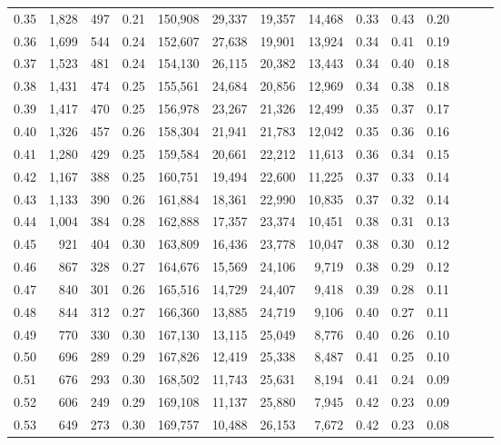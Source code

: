 \begin{tabular}{rrrrrrrrrrrrrr}
0.35 &  1,828 &  497 &  0.21 &  150,908 &   29,337 &  19,357 &  14,468 &  0.33 &  0.43 &      0.20 \\
0.36 &  1,699 &  544 &  0.24 &  152,607 &   27,638 &  19,901 &  13,924 &  0.34 &  0.41 &      0.19 \\
0.37 &  1,523 &  481 &  0.24 &  154,130 &   26,115 &  20,382 &  13,443 &  0.34 &  0.40 &      0.18 \\
0.38 &  1,431 &  474 &  0.25 &  155,561 &   24,684 &  20,856 &  12,969 &  0.34 &  0.38 &      0.18 \\
0.39 &  1,417 &  470 &  0.25 &  156,978 &   23,267 &  21,326 &  12,499 &  0.35 &  0.37 &      0.17 \\
0.40 &  1,326 &  457 &  0.26 &  158,304 &   21,941 &  21,783 &  12,042 &  0.35 &  0.36 &      0.16 \\
0.41 &  1,280 &  429 &  0.25 &  159,584 &   20,661 &  22,212 &  11,613 &  0.36 &  0.34 &      0.15 \\
0.42 &  1,167 &  388 &  0.25 &  160,751 &   19,494 &  22,600 &  11,225 &  0.37 &  0.33 &      0.14 \\
0.43 &  1,133 &  390 &  0.26 &  161,884 &   18,361 &  22,990 &  10,835 &  0.37 &  0.32 &      0.14 \\
0.44 &  1,004 &  384 &  0.28 &  162,888 &   17,357 &  23,374 &  10,451 &  0.38 &  0.31 &      0.13 \\
0.45 &    921 &  404 &  0.30 &  163,809 &   16,436 &  23,778 &  10,047 &  0.38 &  0.30 &      0.12 \\
0.46 &    867 &  328 &  0.27 &  164,676 &   15,569 &  24,106 &   9,719 &  0.38 &  0.29 &      0.12 \\
0.47 &    840 &  301 &  0.26 &  165,516 &   14,729 &  24,407 &   9,418 &  0.39 &  0.28 &      0.11 \\
0.48 &    844 &  312 &  0.27 &  166,360 &   13,885 &  24,719 &   9,106 &  0.40 &  0.27 &      0.11 \\
0.49 &    770 &  330 &  0.30 &  167,130 &   13,115 &  25,049 &   8,776 &  0.40 &  0.26 &      0.10 \\
0.50 &    696 &  289 &  0.29 &  167,826 &   12,419 &  25,338 &   8,487 &  0.41 &  0.25 &      0.10 \\
0.51 &    676 &  293 &  0.30 &  168,502 &   11,743 &  25,631 &   8,194 &  0.41 &  0.24 &      0.09 \\
0.52 &    606 &  249 &  0.29 &  169,108 &   11,137 &  25,880 &   7,945 &  0.42 &  0.23 &      0.09 \\
0.53 &    649 &  273 &  0.30 &  169,757 &   10,488 &  26,153 &   7,672 &  0.42 &  0.23 &      0.08 \\

\end{tabular}
